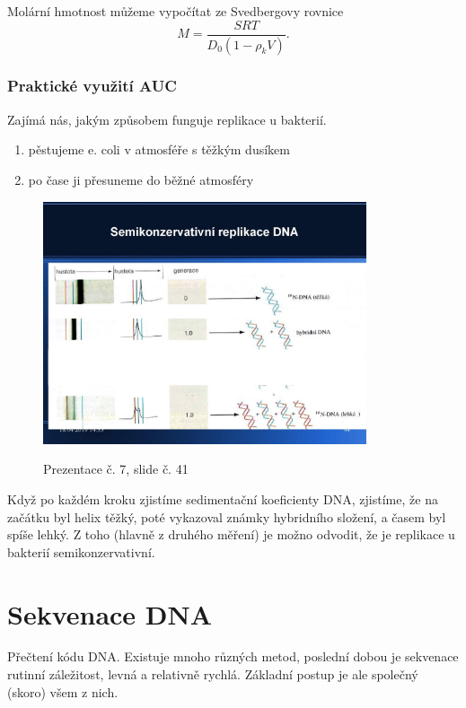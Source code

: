 \documentclass[DIV=8]{scrreprt}
\begin{document}
Molární hmotnost můžeme vypočítat ze Svedbergovy rovnice
\[M = \frac{S R T}{D_0 (1 - \rho_k V)}.\]

\subsection{Praktické využití AUC} \label{Praktické využití AUC}


Zajímá nás, jakým způsobem funguje replikace u bakterií.

\begin{enumerate}[nosep]
    \item pěstujeme e. coli v atmosféře s těžkým dusíkem
    \item po čase ji přesuneme do běžné atmosféry
\end{enumerate}



\begin{figure}
    \caption{Prezentace č. 7, slide č. 41}
    \includegraphics[width=0.85\textwidth]{slides-7/slide-41.jpg}
    \centering
    \label{slides-7-slide-41}
\end{figure}

Když po každém kroku zjistíme sedimentační koeficienty DNA, zjistíme, že na začátku byl helix těžký, poté vykazoval známky hybridního složení, a časem byl spíše lehký. Z toho (hlavně z druhého měření) je možno odvodit, že je replikace u bakterií semikonzervativní.

\chapter{Sekvenace DNA} \label{Sekvenace DNA}


Přečtení kódu DNA. Existuje mnoho různých metod, poslední dobou je sekvenace rutinní záležitost, levná a relativně rychlá. Základní postup je ale společný (skoro) všem z nich.
\end{document}
